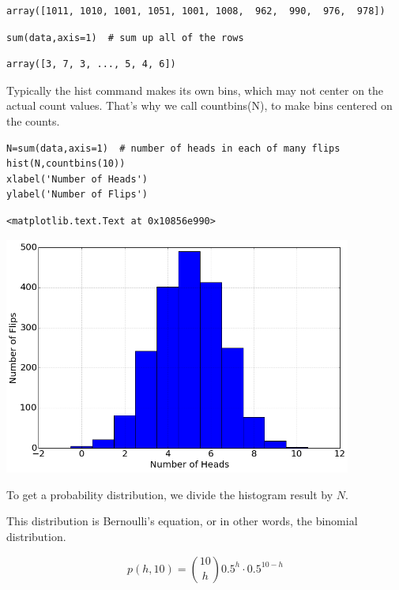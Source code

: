 \begin{verbatim}
array([1011, 1010, 1001, 1051, 1001, 1008,  962,  990,  976,  978])
\end{verbatim}

\begin{lstlisting}
sum(data,axis=1)  # sum up all of the rows
\end{lstlisting}

\begin{verbatim}
array([3, 7, 3, ..., 5, 4, 6])
\end{verbatim}

Typically the hist command makes its own bins, which may not center on the
actual count values.  That's why we call countbins(N), to make bins centered on
the counts.

\begin{lstlisting}
N=sum(data,axis=1)  # number of heads in each of many flips
hist(N,countbins(10))
xlabel('Number of Heads')
ylabel('Number of Flips')
\end{lstlisting}

\begin{verbatim}
<matplotlib.text.Text at 0x10856e990>
\end{verbatim}

\begin{center}\includegraphics[width=4.5in]{Applications_of_Probability/Applications_of_Probability_fig0.png}\end{center}

To get a probability distribution, we divide the histogram result by $N$.

This distribution is Bernoulli's equation, or in other words, the binomial
distribution.

\[ p(h,10) = {10 \choose h} 0.5^h \cdot 0.5 ^{10-h} \]

